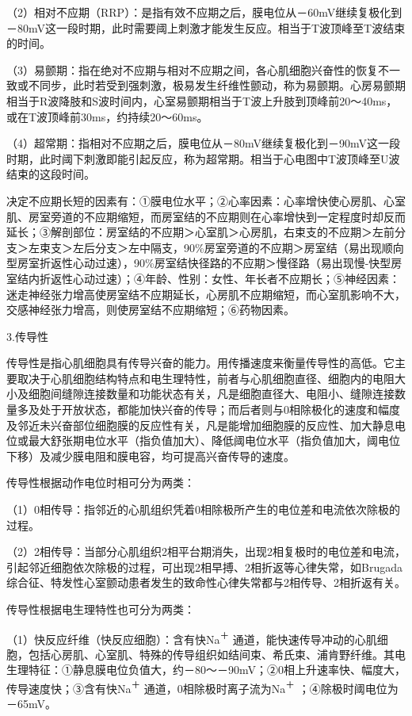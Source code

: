 （2）相对不应期（RRP）：是指有效不应期之后，膜电位从－60mV继续复极化到－80mV这一段时期，此时需要阈上刺激才能发生反应。相当于T波顶峰至T波结束的时间。

（3）易颤期：指在绝对不应期与相对不应期之间，各心肌细胞兴奋性的恢复不一致或不同步，此时若受到强刺激，极易发生纤维性颤动，称为易颤期。心房易颤期相当于R波降肢和S波时间内，心室易颤期相当于T波上升肢到顶峰前20～40ms，或在T波顶峰前30ms，约持续20～60ms。

（4）超常期：指相对不应期之后，膜电位从－80mV继续复极化到－90mV这一段时期，此时阈下刺激即能引起反应，称为超常期。相当于心电图中T波顶峰至U波结束的这段时间。

决定不应期长短的因素有：①膜电位水平；②心率因素：心率增快使心房肌、心室肌、房室旁道的不应期缩短，而房室结的不应期则在心率增快到一定程度时却反而延长；③解剖部位：房室结的不应期＞心室肌＞心房肌，右束支的不应期＞左前分支＞左束支＞左后分支＞左中隔支，90\%房室旁道的不应期＞房室结（易出现顺向型房室折返性心动过速），90\%房室结快径路的不应期＞慢径路（易出现慢-快型房室结内折返性心动过速）；④年龄、性别：女性、年长者不应期长；⑤神经因素：迷走神经张力增高使房室结不应期延长，心房肌不应期缩短，而心室肌影响不大，交感神经张力增高，则使房室结不应期缩短；⑥药物因素。

3.传导性

传导性是指心肌细胞具有传导兴奋的能力。用传播速度来衡量传导性的高低。它主要取决于心肌细胞结构特点和电生理特性，前者与心肌细胞直径、细胞内的电阻大小及细胞间缝隙连接数量和功能状态有关，凡是细胞直径大、电阻小、缝隙连接数量多及处于开放状态，都能加快兴奋的传导；而后者则与0相除极化的速度和幅度及邻近未兴奋部位细胞膜的反应性有关，凡是能增加细胞膜的反应性、加大静息电位或最大舒张期电位水平（指负值加大）、降低阈电位水平（指负值加大，阈电位下移）及减少膜电阻和膜电容，均可提高兴奋传导的速度。

传导性根据动作电位时相可分为两类：

（1）0相传导：指邻近的心肌组织凭着0相除极所产生的电位差和电流依次除极的过程。

（2）2相传导：当部分心肌组织2相平台期消失，出现2相复极时的电位差和电流，引起邻近细胞依次除极的过程，可出现2相早搏、2相折返等心律失常，如Brugada综合征、特发性心室颤动患者发生的致命性心律失常都与2相传导、2相折返有关。

传导性根据电生理特性也可分为两类：

（1）快反应纤维（快反应细胞）：含有快Na\textsuperscript{＋}
通道，能快速传导冲动的心肌细胞，包括心房肌、心室肌、特殊的传导组织如结间束、希氏束、浦肯野纤维。其电生理特征：①静息膜电位负值大，约－80～－90mV；②0相上升速率快、幅度大，传导速度快；③含有快Na\textsuperscript{＋}
通道，0相除极时离子流为Na\textsuperscript{＋} ；④除极时阈电位为－65mV。

